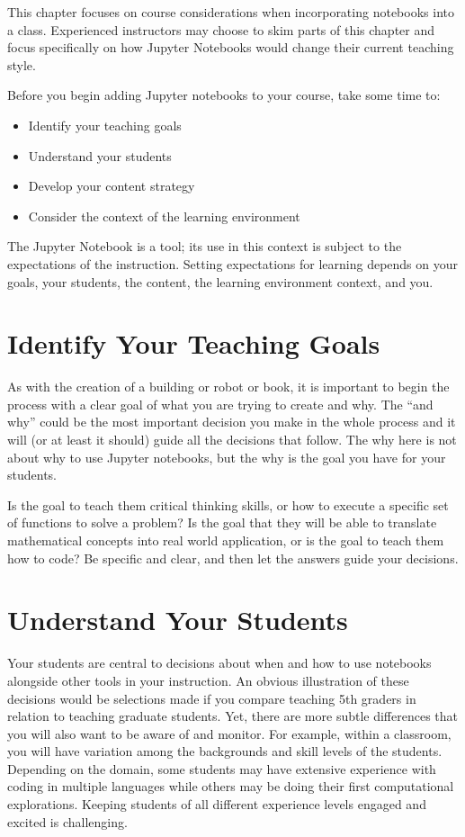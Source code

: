 \documentclass[]{book}
\providecommand{\tightlist}{%
  \setlength{\itemsep}{0pt}\setlength{\parskip}{0pt}}
\begin{document}
This chapter focuses on course considerations when incorporating
notebooks into a class. Experienced instructors may choose to skim parts
of this chapter and focus specifically on how Jupyter Notebooks would
change their current teaching style.

Before you begin adding Jupyter notebooks to your course, take some time
to:

\begin{itemize}
\tightlist
\item
  Identify your teaching goals
\item
  Understand your students
\item
  Develop your content strategy
\item
  Consider the context of the learning environment
\end{itemize}

The Jupyter Notebook is a tool; its use in this context is subject to
the expectations of the instruction. Setting expectations for learning
depends on your goals, your students, the content, the learning
environment context, and you.

\section{Identify Your Teaching
Goals}\label{identify-your-teaching-goals}

As with the creation of a building or robot or book, it is important to
begin the process with a clear goal of what you are trying to create and
why. The ``and why'' could be the most important decision you make in
the whole process and it will (or at least it should) guide all the
decisions that follow. The why here is not about why to use Jupyter
notebooks, but the why is the goal you have for your students.

Is the goal to teach them critical thinking skills, or how to execute a
specific set of functions to solve a problem? Is the goal that they will
be able to translate mathematical concepts into real world application,
or is the goal to teach them how to code? Be specific and clear, and
then let the answers guide your decisions.

\section{Understand Your Students}\label{understand-your-students}

Your students are central to decisions about when and how to use
notebooks alongside other tools in your instruction. An obvious
illustration of these decisions would be selections made if you compare
teaching 5th graders in relation to teaching graduate students. Yet,
there are more subtle differences that you will also want to be aware of
and monitor. For example, within a classroom, you will have variation
among the backgrounds and skill levels of the students. Depending on the
domain, some students may have extensive experience with coding in
multiple languages while others may be doing their first computational
explorations. Keeping students of all different experience levels
engaged and excited is challenging.
\end{document}
